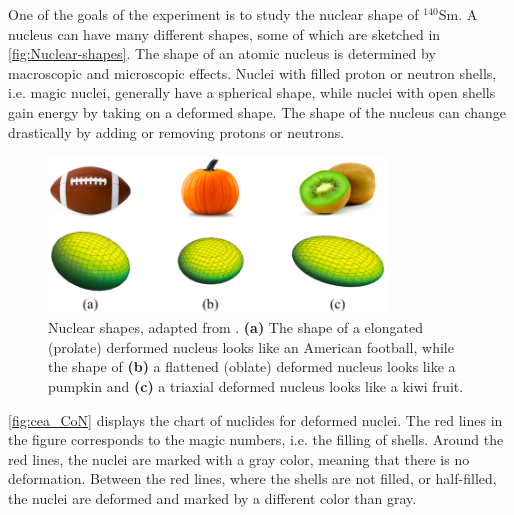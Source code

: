 \documentclass[twoside,english]{uiofysmaster/uiofysmaster}
\newcommand{\Sm}{$^{140}$Sm} %
\let\orgautoref\autoref
\renewcommand{\autoref}
        {%
		 \def\sectionautorefname{Section}%
		 \def\subsectionautorefname{Section}%
		 \def\subsubsectionautorefname{Section}%
		 \def\chapterautorefname{Chapter}%
          \orgautoref}
\begin{document}


One of the goals of the experiment is to study the nuclear shape of \Sm. 
A nucleus can have many different shapes, some of which are sketched in \autoref{fig:Nuclear-shapes}.
The shape of an atomic nucleus is determined by macroscopic and microscopic effects. 
Nuclei with filled proton or neutron shells, i.e. magic nuclei, generally have a spherical shape, while nuclei with open shells gain energy by taking on a deformed shape.
The shape of the nucleus can change drastically by adding or removing protons or neutrons.


\begin{figure}[htb]
	\centering
	\includegraphics[width=0.8\textwidth]{Images/nuclear-shapes-v2.png}
	\caption{Nuclear shapes, adapted from \cite{MSU-shapes}. 
	\textbf{(a)} The shape of a elongated (prolate) derformed nucleus looks like an American football, while the shape of \textbf{(b)} a flattened (oblate) deformed nucleus looks like a pumpkin and \textbf{(c)} a triaxial deformed nucleus looks like a kiwi fruit.}
	\label{fig:Nuclear-shapes}
\end{figure}


\autoref{fig:cea_CoN} displays the chart of nuclides for deformed nuclei. 
The red lines in the figure corresponds to the magic numbers, i.e. the filling of shells. 
Around the red lines, the nuclei are marked with a gray color, meaning that there is no deformation. 
Between the red lines, where the shells are not filled, or half-filled, the nuclei are deformed and marked by a different color than gray. 
\end{document}
